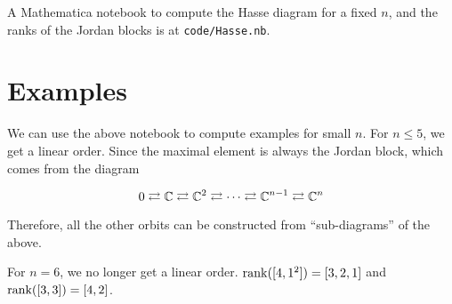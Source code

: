 \documentclass{article}
\newcommand{\rla}{\rightleftarrows}
\begin{document}
A Mathematica notebook to compute the Hasse diagram for a fixed \(n\), and the ranks of the Jordan blocks is at \texttt{code/Hasse.nb}.

\section*{Examples}

We can use the above notebook to compute examples for small \(n\). For \(n \le 5\), we get a linear order. Since the maximal element is always the Jordan block, which comes from the diagram

\[0 \rla \C \rla \C^2 \rla \cdots \rla \C^{n-1} \rla \C^n\]

Therefore, all the other orbits can be constructed from ``sub-diagrams'' of the above.

For \(n = 6\), we no longer get a linear order. \(\rank([4, 1^2]) = [3,2,1]\) and \(\rank([3,3]) = [4, 2]\).

\printbibliography
\end{document}
